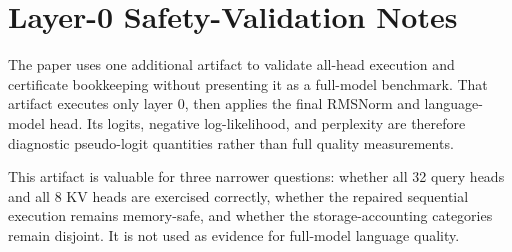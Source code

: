\section{Layer-0 Safety-Validation Notes}
\label{app:perhead}

The paper uses one additional artifact to validate all-head execution and certificate bookkeeping without presenting it as a full-model benchmark. That artifact executes only layer \(0\), then applies the final RMSNorm and language-model head. Its logits, negative log-likelihood, and perplexity are therefore diagnostic pseudo-logit quantities rather than full \modeldisplay{} quality measurements.

\begin{table}[h]
  \centering
  \small
  
  \caption{Corrected layer-0 safety-validation summary. These numbers support memory, bookkeeping, and logical-skip claims only.}
  \label{tab:layerzero}
\end{table}

This artifact is valuable for three narrower questions: whether all 32 query heads and all 8 KV heads are exercised correctly, whether the repaired sequential execution remains memory-safe, and whether the storage-accounting categories remain disjoint. It is not used as evidence for full-model language quality.

